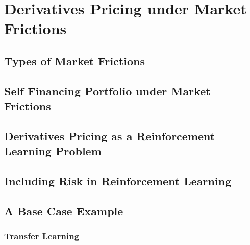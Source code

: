 \chapter{Derivatives Pricing under Market Frictions}
\label{chap:MarketRisk}

\section{Types of Market Frictions}
\section{Self Financing Portfolio under Market Frictions}

\section{Derivatives Pricing as a Reinforcement Learning Problem}

\section{Including Risk in Reinforcement Learning}

\section{A Base Case Example}

\subsection{Transfer Learning}

